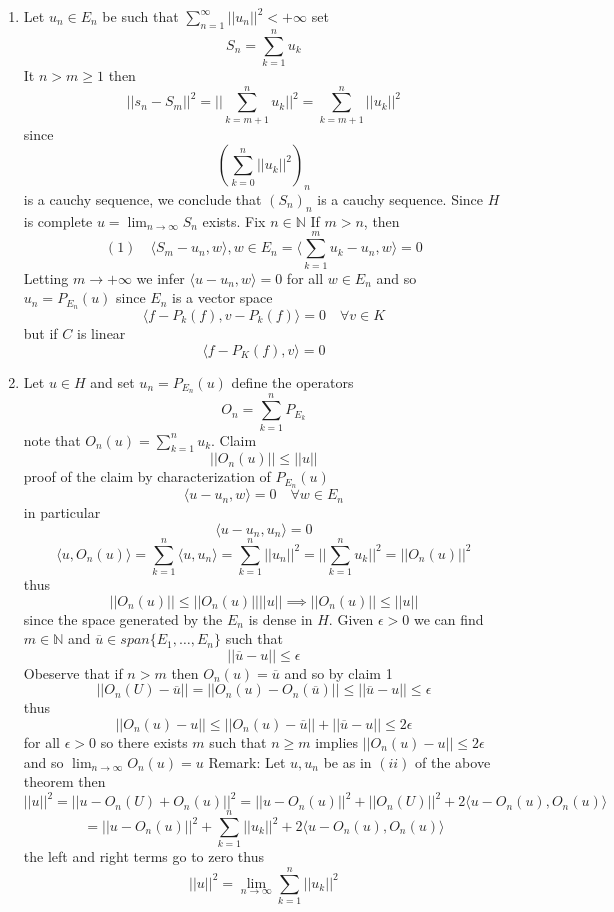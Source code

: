 \documentclass[11pt]{article}
\begin{document}
\begin{enumerate}
    \item Let $u_n \in E_n$ be such that $\sum_{n=1}^{\infty}||u_n||^2 < +\infty$ set
        \[
        S_n = \sum_{k=1}^{n}u_k
        \] 
        It $n > m \ge 1$ then
         \[
             ||s_n- S_m||^2 = ||\sum_{k=m+1}^{n}u_k||^2 = \sum_{k={m+1}}^{n}||u_k||^2 
        \] 
        since
        \[
            (\sum_{k=0}^{n}||u_k||^2)_n
        \] 
        is a cauchy sequence, we conclude that $(S_n)_n$ is a cauchy sequence.
        Since $H$ is complete $u = \lim_{n\to \infty}S_n$ exists. Fix $n \in \mathbb{N}$ If $m > n$, then 
         \[
             (1) \quad        \langle S_m - u_n, w \rangle, w \in E_n = \langle \sum_{k=1}^{m} u_k - u_n, w \rangle = 0
        \] 
        Letting $m \to +\infty$ we infer $\langle u - u_n, w \rangle = 0$ for all $w \in E_n$ and so  $u_n = P_{E_n}(u)$ since  $E_n$ is a vector space
        \[
        \langle f - P_k(f) , v - P_k(f) \rangle = 0 \quad \forall v \in K
        \] 
        but if $C$ is linear
        \[
        \langle f - P_K(f), v \rangle = 0
        \] 
    \item Let $u \in H$ and set  $u_n = P_{E_n}(u)$ define the operators
        \[
            O_n = \sum_{k=1}^{n}P_{E_k}
        \] 
        note that $O_n(u) = \sum_{k=1}^{n}u_k$.
        Claim
        \[
        ||O_n(u)|| \le ||u||
        \] 
        proof of the claim by characterization of $P_{E_n}(u)$
         \[
        \langle u - u_n, w \rangle = 0 \quad \forall w \in E_n
        \] 
        in particular
        \[
        \langle u - u_n, u_n \rangle = 0
        \] 
        \[
        \langle u , O_n(u) \rangle = \sum_{k=1}^{n}\langle u, u_n \rangle = \sum_{k=1}^{n}||u_n||^2 = || \sum_{k=1}^{n} u_k||^2 = ||O_n(u)||^2
        \] 
        thus
        \[
        ||O_n(u)|| \le ||O_n(u)||||u|| \implies ||O_n(u) || \le ||u||
        \] 
        since the space generated by the $E_n$ is dense in $H$. Given $\epsilon > 0$ we can find $m \in \mathbb{N}$ and $\overline{u} \in span \{E_1,\dots,E_n\}$ such that
        \[
        ||\overline{u} - u|| \le \epsilon
        \] 
        Obeserve that if $n > m$ then  $O_n(u) = \overline{ u}$ %
        and so by claim 1
        \[
        ||O_n(U) - \overline{u}|| = ||O_n(u) - O_n(\overline{ u})|| \le ||\overline{ u} - u || \le \epsilon
        \] 
        thus
         \[
        ||O_n(u) - u|| \le ||O_n(u) - \overline{ u}|| + || \overline{ u} - u|| \le 2\epsilon
        \] 
        for all $\epsilon > 0$ so there exists $m$ such that $n \ge m$ implies  $||O_n(u) - u|| \le 2\epsilon$ and so $\lim_{n\to \infty} O_n(u) =u$
        Remark: Let $u, u_n$ be as in  $(ii)$ of the above theorem then
         \[
        ||u||^2 = ||u - O_n(U) + O_n(u)||^2  = ||u - O_n(u)||^2 + ||O_n(U)||^2 + 2\langle u - O_n(u) , O_n(u) \rangle
        \] 
        \[
         = ||u - O_n(u)||^2 + \sum_{k=1}^{n}||u_k||^2 + 2 \langle u - O_n(u), O_n(u) \rangle
        \] 
        the left and right terms go to zero thus
        \[
        ||u||^2 = \lim_{n\to \infty}\sum_{k=1}^{n} ||u_k||^2
        \] 
\end{enumerate}
\end{document}
